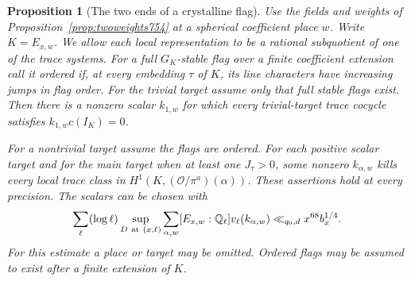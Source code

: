 \documentclass[a4paper,11pt]{article}
\newtheorem{proposition}{Proposition}[section]
\theoremstyle{definition}
\theoremstyle{remark}
\numberwithin{equation}{section}
\begin{document}
\begin{proposition}[The two ends of a crystalline flag]
\leavevmode\label{prop:ordinaryunits756}
Use the fields and weights of Proposition~\ref{prop:twoweights754}
at a spherical coefficient place \(w\). Write \(K=E_{x,w}\).
We allow each local representation to be a rational subquotient
of one of the trace systems. For a full \(G_K\)-stable flag over a
finite coefficient extension call it ordered if, at every embedding
\(\tau\) of \(K\), its line characters have increasing jumps in flag
order. For the trivial target assume only that full stable flags
exist. Then there is a nonzero scalar \(k_{1,w}\) for which every
trivial-target trace cocycle satisfies \(k_{1,w}c(I_K)=0\).

For a nontrivial target assume the flags are ordered. For each
positive scalar target and for the main target when at least one
\(J_\tau>0\), some nonzero \(k_{\alpha,w}\) kills every local
trace class in \(H^1(K,(\mathcal O/\pi^a)(\alpha))\). These assertions
hold at every precision. The scalars can be chosen with
\[
 \sum_\ell(\log\ell)\sup_{D\ {\rm at}\ (x,\ell)}
       \sum_{\alpha,w}[E_{x,w}:\QQ_\ell]v_\ell(k_{\alpha,w})
                   \ll_{q_0,d} x^{68}b_x^{1/4}.
\]
For this estimate a place or target may be omitted. Ordered flags
may be assumed to exist after a finite extension of \(K\).
\end{proposition}
\end{document}
